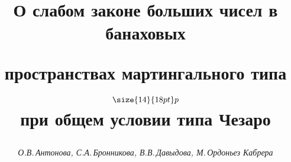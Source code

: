 









\newcommand{\tts}[1]{}







\setcounter{page}{3}















\author{\it О.В.\,Антонова, С.А.\,Бронникова, В.В.\,Давыдова, М.\,Ордоньез Кабрера}




\title{О слабом законе больших чисел в банаховых


пространствах мартингального типа $\size{14}{18pt}\selectfont p$\\


при общем условии типа Чезаро}





\date{}




\pagestyle{plain} %







\maketitle


